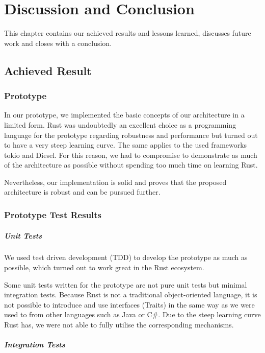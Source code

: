 \chapter{Discussion and Conclusion}
\label{sec:discussion-and-conclusion}
This chapter contains our achieved results and lessons learned, discusses future work and closes with a conclusion.

\section{Achieved Result}

\subsection{Prototype}

In our prototype, we implemented the basic concepts of our architecture in a limited form. Rust was undoubtedly an excellent choice as a programming language for the prototype regarding robustness and performance but turned out to have a very steep learning curve. The same applies to the used frameworks tokio and Diesel. For this reason, we had to compromise to demonstrate as much of the architecture as possible without spending too much time on learning Rust.

Nevertheless, our implementation is solid and proves that the proposed architecture is robust and can be pursued further.

\subsection{Prototype Test Results}

\paragraph{Unit Tests}
We used test driven development (TDD) to develop the prototype as much as possible, which turned out to work great in the Rust ecosystem.

Some unit tests written for the prototype are not pure unit tests but minimal integration tests. Because Rust is not a traditional object-oriented language, it is not possible to introduce and use interfaces (Traits) in the same way as we were used to from other languages such as Java or C\#. Due to the steep learning curve Rust has, we were not able to fully utilise the corresponding mechanisms.

\paragraph{Integration Tests}

